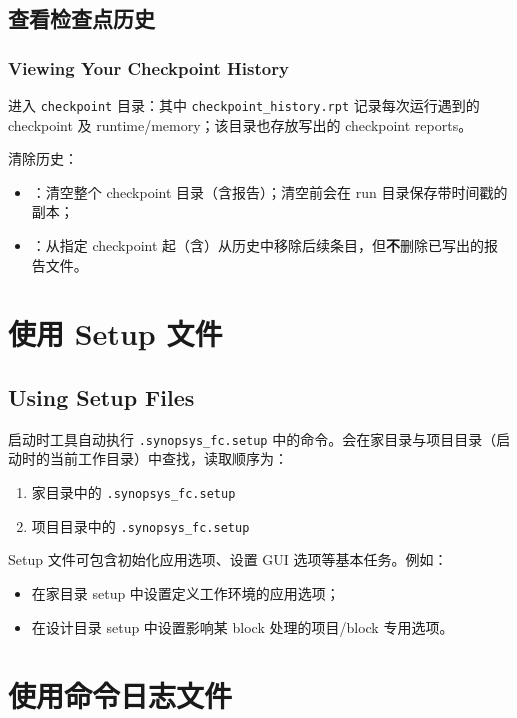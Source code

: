 \subsection{查看检查点历史}
\subsubsection*{Viewing Your Checkpoint History}

进入 \texttt{checkpoint} 目录：其中 \texttt{checkpoint\_history.rpt} 记录每次运行遇到的 checkpoint 及 runtime/memory；该目录也存放写出的 checkpoint reports。

清除历史：
\begin{itemize}
  \item {}：清空整个 checkpoint 目录（含报告）；清空前会在 run 目录保存带时间戳的副本；
  \item {}：从指定 checkpoint 起（含）从历史中移除后续条目，但\textbf{不}删除已写出的报告文件。
\end{itemize}

\section{使用 Setup 文件}
\subsection*{Using Setup Files}

启动时工具自动执行 \texttt{.synopsys\_fc.setup} 中的命令。会在家目录与项目目录（启动时的当前工作目录）中查找，读取顺序为：
\begin{enumerate}
  \item 家目录中的 \texttt{.synopsys\_fc.setup}
  \item 项目目录中的 \texttt{.synopsys\_fc.setup}
\end{enumerate}

Setup 文件可包含初始化应用选项、设置 GUI 选项等基本任务。例如：
\begin{itemize}
  \item 在家目录 setup 中设置定义工作环境的应用选项；
  \item 在设计目录 setup 中设置影响某 block 处理的项目/block 专用选项。
\end{itemize}

\section{使用命令日志文件}
